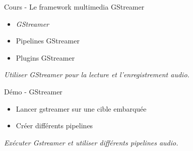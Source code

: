 \documentclass[a4paper,12pt,obeyspaces,spaces,hyphens]{article}
\begin{document}
\feagendatwocolumn
{Cours - Le framework multimedia GStreamer}
{
  \begin{itemize}
  \item {\em GStreamer}
  \item Pipelines GStreamer
  \item Plugins GStreamer
  \end{itemize}
  \vspace{0.5em}
  {\em Utiliser GStreamer pour la lecture et l'enregistrement audio.}
}
{Démo - GStreamer}
{
  \begin{itemize}
  \item Lancer gstreamer sur une cible embarquée
  \item Créer différents pipelines
  \end{itemize}
  \vspace{0.5em}
  {\em Exécuter Gstreamer et utiliser différents pipelines audio.}
}
\end{document}
